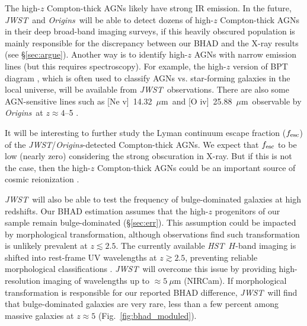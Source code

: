 \documentclass[twocolumn,twocolappendix,times]{aastex63}
\newcommand{\hst}{{\it HST\/}}       %
\newcommand{\jwst}{{\it JWST\/}}
\newcommand{\origins}{{\it Origins\/}}
\newcommand{\nev}{[Ne {\sc v}]~14.32~$\mu$m}
\newcommand{\oiv}{[O {\sc iv}]~25.88~$\mu$m}
\newcommand{\xray}{\hbox{X-ray}}  %
\newcommand{\cjp}[2]{\textcolor{red}{#1}}
\newcommand{\fst}[1]{#1}
\begin{document}
\begin{CJK*}{UTF8}{gbsn}
\fst{The high-$z$ Compton-thick AGNs likely have strong IR emission.
In the future, \jwst\ and \origins\ will be able to detect dozens of high-$z$ Compton-thick AGNs in their deep broad-band imaging surveys, if this heavily obscured population is mainly responsible for the discrepancy between our BHAD and the X-ray results (see \S\ref{sec:argue}).
Another way is to identify high-$z$ AGNs with narrow emission lines (but this requires spectroscopy). 
For example, the high-$z$ version of BPT diagram \citep{baldwin81}, which is often used to classify AGNs vs. star-forming galaxies in the local universe, will be available from \jwst\ observations.
There are also some AGN-sensitive lines such as \nev\ and \oiv\ observable by \origins\ at $z\approx 4$--5 \citep[e.g.,][]{satyapal20}.
}
It will be interesting to further study the Lyman continuum escape fraction ($f_{\rm esc}$) of the \jwst/\origins-detected Compton-thick AGNs. 
We expect that $f_{\rm esc}$ to be low (nearly zero) considering the strong obscuration in \xray. 
But if this is not the case, then the high-$z$ Compton-thick 
AGNs could be an important source of cosmic reionization \citep[e.g.,][]{fan06, robertson15, finkelstein19}.

\jwst\ will also be able to test the frequency of bulge-dominated galaxies at high redshifts. 
Our BHAD estimation assumes that the high-$z$ progenitors of our 
sample remain bulge-dominated (\S\ref{sec:err}). 
This assumption could be impacted by  morphological transformation,
although observations find such transformation is unlikely prevalent at 
$z\lesssim 2.5$.
The currently available \hst\ $H$-band imaging is shifted into
rest-frame UV wavelengths at $z\gtrsim 2.5$, preventing reliable
morphological classifications \citep[e.g.,][]{conselice14, huertas_company15}. 
\jwst\ will overcome this issue by providing high-resolution 
imaging of wavelengths up to $\approx 5\ \mu$m (NIRCam).
If morphological transformation is responsible for our 
reported BHAD difference, \jwst\ will find that bulge-dominated 
galaxies are very rare, less than a few percent among massive 
galaxies at $z\approx 5$ (Fig.~\ref{fig:bhad_moduled}).  


\end{CJK*}
\end{document}
